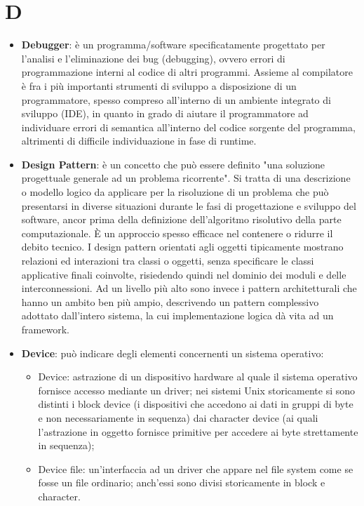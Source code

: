 \section{D}
\begin{itemize} 
	\item
	\textbf{Debugger}: è un programma/software specificatamente progettato per l'analisi e l'eliminazione dei bug (debugging), ovvero errori di programmazione interni al codice di altri programmi. Assieme al compilatore è fra i più importanti strumenti di sviluppo a disposizione di un programmatore, spesso compreso all'interno di un ambiente integrato di sviluppo (IDE), in quanto in grado di aiutare il programmatore ad individuare errori di semantica all'interno del codice sorgente del programma, altrimenti di difficile individuazione in fase di runtime.
	\item
	\textbf{Design Pattern}: è un concetto che può essere definito "una soluzione progettuale generale ad un problema ricorrente". Si tratta di una descrizione o modello logico da applicare per la risoluzione di un problema che può presentarsi in diverse situazioni durante le fasi di progettazione e sviluppo del software, ancor prima della definizione dell'algoritmo risolutivo della parte computazionale. È un approccio spesso efficace nel contenere o ridurre il debito tecnico.
I design pattern orientati agli oggetti tipicamente mostrano relazioni ed interazioni tra classi o oggetti, senza specificare le classi applicative finali coinvolte, risiedendo quindi nel dominio dei moduli e delle interconnessioni. Ad un livello più alto sono invece i pattern architetturali che hanno un ambito ben più ampio, descrivendo un pattern complessivo adottato dall'intero sistema, la cui implementazione logica dà vita ad un framework.
	\item
	\textbf{Device}: può indicare degli elementi concernenti un sistema operativo:
	 \begin{itemize} 
	\item
    Device: astrazione di un dispositivo hardware al quale il sistema operativo fornisce accesso mediante un driver; nei sistemi Unix storicamente si sono distinti i block device (i dispositivi che accedono ai dati in gruppi di byte e non necessariamente in sequenza) dai character device (ai quali l'astrazione in oggetto fornisce primitive per accedere ai byte strettamente in sequenza);
 	\item  
    Device file: un'interfaccia ad un driver che appare nel file system come se fosse un file ordinario; anch'essi sono divisi storicamente in block e character.

\end{itemize}
\end{itemize}

